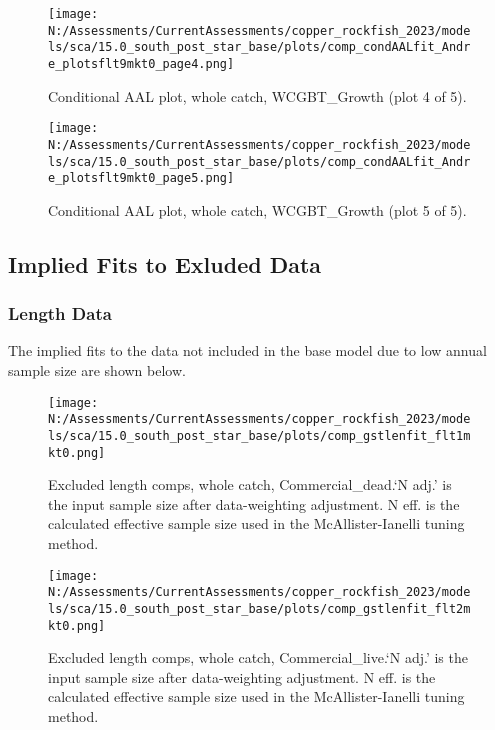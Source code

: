 \documentclass[11pt,
  english,
  letterpaper,
]{article}
\begin{document}
\begin{figure}
\centering
\texttt{[image: N:/Assessments/CurrentAssessments/copper\_rockfish\_2023/models/sca/15.0\_south\_post\_star\_base/plots/comp\_condAALfit\_Andre\_plotsflt9mkt0\_page4.png]}
\caption{Conditional AAL plot, whole catch, WCGBT\_Growth (plot 4 of 5).\label{fig:comp_condAALfit_Andre_plotsflt9mkt0_page4}}
\end{figure}

\begin{figure}
\centering
\texttt{[image: N:/Assessments/CurrentAssessments/copper\_rockfish\_2023/models/sca/15.0\_south\_post\_star\_base/plots/comp\_condAALfit\_Andre\_plotsflt9mkt0\_page5.png]}
\caption{Conditional AAL plot, whole catch, WCGBT\_Growth (plot 5 of 5).\label{fig:comp_condAALfit_Andre_plotsflt9mkt0_page5}}
\end{figure}

\pagebreak

\hypertarget{excluded-data}{%
\subsection{Implied Fits to Exluded Data}\label{excluded-data}}

\hypertarget{length-data-1}{%
\subsubsection{Length Data}\label{length-data-1}}

The implied fits to the data not included in the base model due to low annual sample size are shown below.

\begin{figure}
\centering
\texttt{[image: N:/Assessments/CurrentAssessments/copper\_rockfish\_2023/models/sca/15.0\_south\_post\_star\_base/plots/comp\_gstlenfit\_flt1mkt0.png]}
\caption{Excluded length comps, whole catch, Commercial\_dead.`N adj.' is the input sample size after data-weighting adjustment. N eff. is the calculated effective sample size used in the McAllister-Ianelli tuning method.\label{fig:comp_gstlenfit_flt1mkt0}}
\end{figure}

\begin{figure}
\centering
\texttt{[image: N:/Assessments/CurrentAssessments/copper\_rockfish\_2023/models/sca/15.0\_south\_post\_star\_base/plots/comp\_gstlenfit\_flt2mkt0.png]}
\caption{Excluded length comps, whole catch, Commercial\_live.`N adj.' is the input sample size after data-weighting adjustment. N eff. is the calculated effective sample size used in the McAllister-Ianelli tuning method.\label{fig:comp_gstlenfit_flt2mkt0}}
\end{figure}
\end{document}
